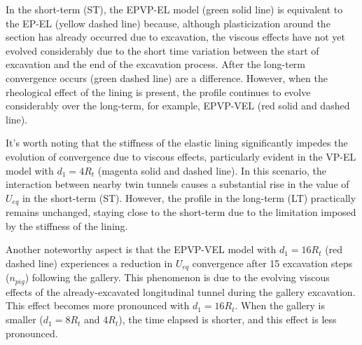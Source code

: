\documentclass[a4paper,fleqn]{cas-sc}
\begin{document}
In the short-term (ST), the EPVP-EL model (green solid line) is equivalent to the EP-EL (yellow dashed line) because, although plasticization around the section has already occurred due to excavation, the viscous effects have not yet evolved considerably due to the short time variation between the start of excavation and the end of the excavation process. After the long-term convergence occurs (green dashed line) are a difference. However, when the rheological effect of the lining is present, the profile continues to evolve considerably over the long-term, for example, EPVP-VEL (red solid and dashed line).

It's worth noting that the stiffness of the elastic lining significantly impedes the evolution of convergence due to viscous effects, particularly evident in the VP-EL model with $d_1=4R_t$ (magenta solid and dashed line). In this scenario, the interaction between nearby twin tunnels causes a substantial rise in the value of $U_{eq}$ in the short-term (ST). However, the profile in the long-term (LT) practically remains unchanged, staying close to the short-term due to the limitation imposed by the stiffness of the lining.

Another noteworthy aspect is that the EPVP-VEL model with $d_1 = 16R_t$ (red dashed line) experiences a reduction in $U_{eq}$ convergence after 15 excavation steps ($n_{pig}$) following the gallery. This phenomenon is due to the evolving viscous effects of the already-excavated longitudinal tunnel during the gallery excavation. This effect becomes more pronounced with $d_1 = 16R_t$. When the gallery is smaller ($d_1 = 8R_t$ and $4R_t$), the time elapsed is shorter, and this effect is less pronounced.
\end{document}
